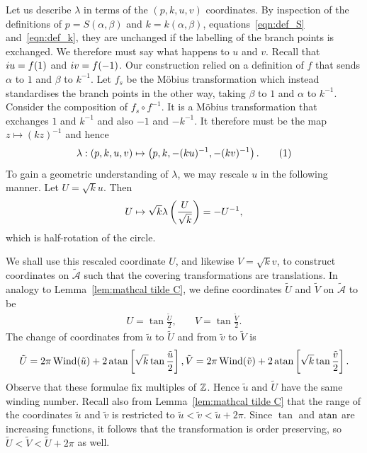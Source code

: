 \documentclass{article}
\begin{document}
Let us describe $\lambda$ in terms of the $(p,k,u,v)$ coordinates.
By inspection of the definitions of $p = S(\alpha,\beta)$ and $k = k(\alpha,\beta)$, equations~\eqref{eqn:def_S} and~\eqref{eqn:def_k}, they are unchanged if the labelling of the branch points is exchanged. We therefore must say what happens to $u$ and $v$. Recall that $i u = f(1)$ and $i v = f(-1)$. Our construction relied on a definition of $f$ that sends $\alpha$ to $1$ and $\beta$ to $k^{-1}$. Let $f_s$ be the M\"obius transformation which instead standardises the branch points in the other way, taking $\beta$ to $1$ and $\alpha$ to $k^{-1}$. Consider the composition of $f_s \circ f^{-1}$. It is a M\"obius transformation that exchanges $1$ and $k^{-1}$ and also $-1$ and $-k^{-1}$. It therefore must be the map $z \mapsto (kz)^{-1}$ and hence
\[
\lambda: (p,k,u,v) \mapsto \bra{ p,k, -(ku)^{-1}, -(kv)^{-1} }.
\labelthis{eqn:def_lambda}
\]
To gain a geometric understanding of $\lambda$, we may rescale $u$ in the following manner. Let $U=\sqrt{k} u$. Then
\[
U
\mapsto \sqrt{k} \lambda\left(\frac{U}{\sqrt{k}} \right)
= -U^{-1},
\]
which is half-rotation of the circle.


We shall use this rescaled coordinate $U$, and likewise $V = \sqrt{k} v$, to construct coordinates on $\mathcal{\tilde{A}}$ such that the covering transformations are translations. 
In analogy to Lemma~\ref{lem:mathcal tilde C}, we define coordinates $\tilde{U}$ and $\tilde{V}$ on $\mathcal{\tilde{A}}$ to be
\begin{align*}
U = \tan \frac{\tilde{U}}{2},       &\quad
V = \tan \frac{\tilde{V}}{2}.       
\end{align*}
The change of coordinates from $\tilde{u}$ to $\tilde{U}$ and from $\tilde{v}$ to $\tilde{V}$ is
\[
\tilde{U} = 2\pi\operatorname{Wind}(\tilde{u}) + 2 \operatorname{atan} \left[ \sqrt{k} \tan \frac{\tilde{u}}{2} \right],
\tilde{V} = 2\pi\operatorname{Wind}(\tilde{v}) + 2 \operatorname{atan} \left[ \sqrt{k} \tan \frac{\tilde{v}}{2} \right].
\]
Observe that these formulae fix multiples of $\mathbb{Z}$.
Hence $\tilde{u}$ and $\tilde{U}$ have the same winding number.
Recall also from Lemma~\ref{lem:mathcal tilde C} that the range of the coordinates $\tilde{u}$ and $\tilde{v}$ is restricted to $\tilde{u} < \tilde{v} < \tilde{u} + 2\pi$.
Since $\tan$ and $\operatorname{atan}$ are increasing functions, it follows that the transformation is order preserving, so $\tilde{U} < \tilde{V} < \tilde{U} + 2\pi$ as well.
\end{document}
